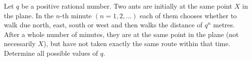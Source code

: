 Let $q$ be a positive rational number. Two ants are initially at the same point $X$ in the plane. In the $n$-th minute $(n = 1,2,...)$ each of them chooses whether to walk due north, east, south or west and then walks the distance of $q^n$ metres. After a whole number of minutes, they are at the same point in the plane (not necessarily $X$), but have not taken exactly the same route within that time. Determine all possible values of $q$.